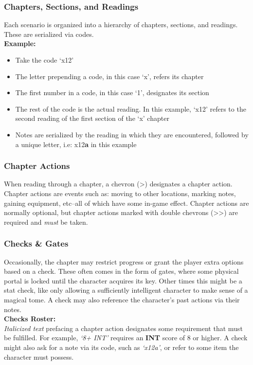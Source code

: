 \documentclass[12pt]{article}
\begin{document}
\begin{multicols*}{2}
\subsubsection{Chapters, Sections, and Readings}
Each scenario is organized into a hierarchy of chapters, sections, and readings. These are serialized via codes.\\
\textbf{Example:}
\begin{itemize}
\item Take the code ‘x12’
\item The letter prepending a code, in this case ‘x’, refers its chapter
\item The first number in a code, in this case ‘1’, designates its section
\item The rest of the code is the actual reading. In this example, ‘x12’ refers to the second reading of the first section of the ‘x’ chapter
\item Notes are serialized by the reading in which they are encountered, followed by a unique letter, i.e: x12\textbf{a} in this example
\end{itemize}

\columnbreak

\subsubsection{Chapter Actions}
When reading through a chapter, a chevron (>) designates a chapter action. Chapter actions are events such as: moving to other locations, marking notes, gaining equipment, etc--all of which have some in-game effect. Chapter actions are normally optional, but chapter actions marked with double chevrons (>>) are required and \emph{must} be taken.

\subsubsection{Checks \& Gates}
Occasionally, the chapter may restrict progress or grant the player extra options based on a check. These often comes in the form of gates, where some physical portal is locked until the character acquires its key. Other times this might be a stat check, like only allowing a sufficiently intelligent character to make sense of a magical tome. A check may also reference the character’s past actions via their notes.\\

\textbf{Checks Roster:}\\
\emph{Italicized text} prefacing a chapter action designates some requirement that must be fulfilled. For example, \emph{‘8+ INT’} requires an \textbf{INT} score of 8 or higher. A check might also ask for a note via its code, such as \emph{‘x12a’}, or refer to some item the character must possess.\\


\end{multicols*}
\end{document}
